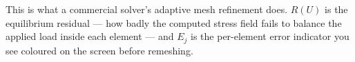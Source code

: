 \begin{mechanics}
This is what a commercial solver's adaptive mesh refinement does. $R(U)$ is the
equilibrium residual --- how badly the computed stress field fails to balance
the applied load inside each element --- and $E_j$ is the per-element error
indicator you see coloured on the screen before remeshing.
\end{mechanics}


